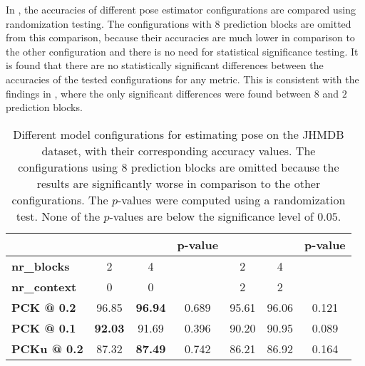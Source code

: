 In , the accuracies of different pose estimator configurations are compared using randomization testing.
The configurations with $8$ prediction blocks are omitted from this comparison, because their accuracies are much lower in comparison to the other configuration and there is no need for statistical significance testing.
It is found that there are no statistically significant differences between the accuracies of the tested configurations for any metric.
This is consistent with the findings in , where the only significant differences were found between $8$ and $2$ prediction blocks.

\begin{table}[]
    \small
    \centering
    \begin{tabular}{|l|c|c|c||c|c|c|}
        \hline
            & & & \textbf{p-value} & & & \textbf{p-value} \\ \hline
            \textbf{nr\_blocks} & 2 & 4 &  & 2 & 4 &  \\ \hline
            \textbf{nr\_context} & 0 & 0 & & 2 & 2 & \\ \hline
            \textbf{PCK @ 0.2} & 96.85 & \textbf{96.94} & 0.689 & 95.61 & 96.06 & 0.121 \\ \hline
            \textbf{PCK @ 0.1} & \textbf{92.03} & 91.69 & 0.396 & 90.20 & 90.95 & 0.089 \\ \hline
            \textbf{PCKu @ 0.2} & 87.32 & \textbf{87.49} & 0.742 & 86.21 & 86.92 & 0.164 \\ \hline
        \end{tabular}
    \caption{Different model configurations for estimating pose on the JHMDB dataset, with their corresponding accuracy values. The configurations using $8$ prediction blocks are omitted because the results are significantly worse in comparison to the other configurations. The $p$-values were computed using a randomization test. None of the $p$-values are below the significance level of $0.05$.}
    \label{tab:jhmdb_results_confidence}
\end{table}

